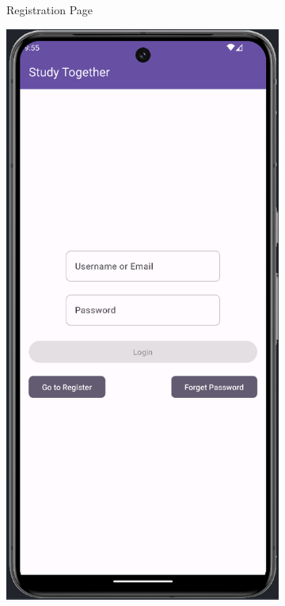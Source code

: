 \begin{figure}[H]
\begin{subfigure}[b]{0.3\textwidth}
    \caption{Registration Page}
    \label{fig:registration}
  \end{subfigure}
  \hfill
  \begin{subfigure}[b]{0.3\textwidth}
    \includegraphics[width=\textwidth]{Figures/Product_Images/Auth/Login.png}

\end{subfigure}
\end{figure}

